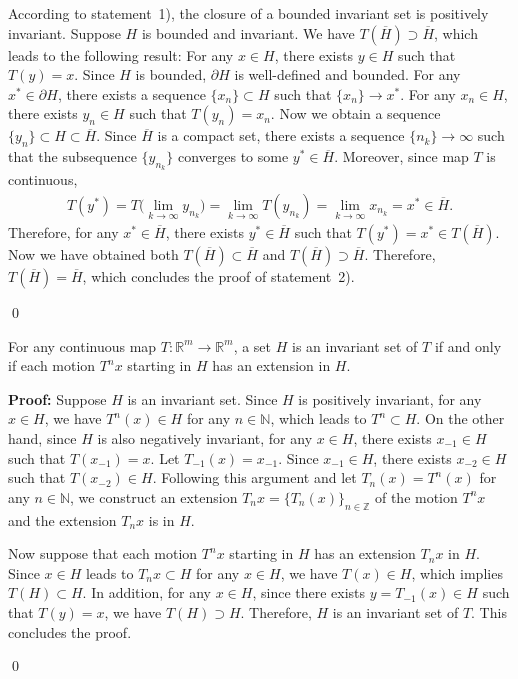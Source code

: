 \documentclass[10pt]{svmult}
\newcommand{\QED}{\begin{flushright}\qed \end{flushright}}
\begin{document}
According to statement~1), the closure of a bounded invariant set is positively invariant. Suppose $H$ is bounded and invariant. We have $T(\overline{H})\supset \overline{H}$, which leads to the following result: For any $x\in H$, there exists $y\in H$ such that $T(y)=x$. Since $H$ is bounded, $\partial H$ is well-defined and bounded. For any $x^*\in \partial H$, there exists a sequence $\{x_n\}\subset H$ such that $\{x_n\}\to x^*$. For any $x_n\in H$, there exists $y_n\in H$ such that $T(y_n)=x_n$. Now we obtain a sequence $\{y_n\}\subset H \subset \overline{H}$. Since $\overline{H}$ is a compact set, there exists a sequence $\{n_k\}\to \infty$ such that the subsequence $\{y_{n_k}\}$ converges to some $y^*\in \overline{H}$. Moreover, since map $T$ is continuous,
\begin{align*}
T(y^*) = T\big( \lim_{k\to \infty} y_{n_k} \big) = \lim_{k\to \infty} T(y_{n_k}) = \lim_{k\to\infty} x_{n_k} = x^* \in \overline{H}.
\end{align*}
Therefore, for any $x^*\in \overline{H}$, there exists $y^*\in \overline{H}$ such that $T(y^*)=x^*\in T(\overline{H})$. Now we have obtained both $T(\overline{H})\subset \overline{H}$ and $T(\overline{H})\supset \overline{H}$. Therefore, $T(\overline{H})=\overline{H}$, which concludes the proof of statement~2). \QED

\begin{lemma}\label{lem:inv-set-extension-motion}
For any continuous map $T:\mathbb{R}^m\to \mathbb{R}^m$, a set $H$ is an invariant set of $T$ if and only if each motion $T^n x$ starting in $H$ has an extension in $H$. 
\end{lemma}

\textbf{Proof:} Suppose $H$ is an invariant set. Since $H$ is positively invariant, for any $x\in H$, we have $T^n(x)\in H$ for any $n\in \mathbb{N}$, which leads to $T^n\subset H$. On the other hand, since $H$ is also negatively invariant, for any $x\in H$, there exists $x_{-1}\in H$ such that $T(x_{-1})=x$. Let $T_{-1}(x)=x_{-1}$. Since $x_{-1}\in H$, there exists $x_{-2}\in H$ such that $T(x_{-2})\in H$. Following this argument and let $T_n(x)=T^n(x)$ for any $n\in \mathbb{N}$, we construct an extension $T_n x=\{T_n(x)\}_{n\in \mathbb{Z}}$ of the motion $T^n x$ and the extension $T_n x$ is in $H$.

Now suppose that each motion $T^n x$ starting in $H$ has an extension $T_n x$ in $H$. Since $x\in H$ leads to $T_n x \subset H$ for any $x\in H$, we have $T(x)\in H$, which implies $T(H)\subset H$. In addition, for any $x\in H$, since there exists $y=T_{-1}(x)\in H$ such that $T(y)=x$, we have $T(H)\supset H$. Therefore, $H$ is an invariant set of $T$. This concludes the proof.  \QED
\end{document}

